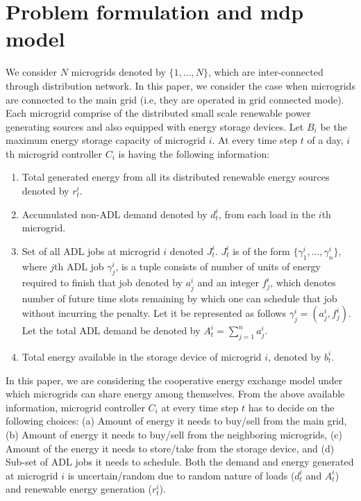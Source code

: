 \section{Problem formulation and mdp model} \label{sec:model}
We consider $N$ microgrids denoted by $\{1,\ldots,N\}$, which are inter-connected through distribution network. In this paper, we consider the case when microgrids are connected  to the main grid (i.e, they are operated in grid connected mode). Each microgrid comprise of the distributed small scale renewable power generating sources and also equipped with energy storage devices. Let $B_i$ be the maximum energy storage capacity of microgrid $i$. At every time step $t$ of a day, $i$th microgrid controller $C_i$ is having the following information:
\begin{enumerate}[label=(\alph*)]
\item Total generated energy from all its distributed renewable energy sources denoted by  $r_t^i$.
\item Accumulated non-ADL demand denoted by $d_t^i$, from each load in the $i$th microgrid. 
\item Set of all ADL jobs at microgrid $i$ denoted $J_{t}^{i}$.  $J_{t}^{i}$ is of the form $\{\gamma_{1}^{i},\ldots,\gamma_{n}^{i}\}$, where $j$th ADL job $\gamma_{j}^{i}$, is a tuple consists of  number of units of energy required to finish that job denoted by $a_{j}^{i}$ and an integer  $f_{j}^{i}$, which denotes number of future time slots remaining by which one can schedule that job without incurring the penalty. Let  it be represented as follows $\gamma_{j}^{i} = (a_{j}^{i}, f_{j}^{i})$. Let the total ADL demand be denoted by $A_t^i= \sum_{j=1}^{n} a_j^i$.
\item  Total energy available in the storage device of microgrid $i$, denoted by $b_{t}^{i}$.
\end{enumerate} 
In this paper, we are considering the cooperative energy exchange model under which microgrids can share energy among themselves. 
From the above available information, microgrid controller  $C_i$ at every time step $t$ has to decide on the following choices: (a)  Amount of energy it needs to buy/sell from the main grid, (b) Amount of energy it needs to buy/sell from the neighboring microgrids,
(c) Amount of the energy it needs to store/take from the storage device, and (d) Sub-set of ADL jobs it needs to schedule. Both the demand and energy generated at microgrid $i$ is uncertain/random due to  random nature of  loads ($d_t^i$ and $A_t^i$) and renewable energy generation ($r_t^i$). 

